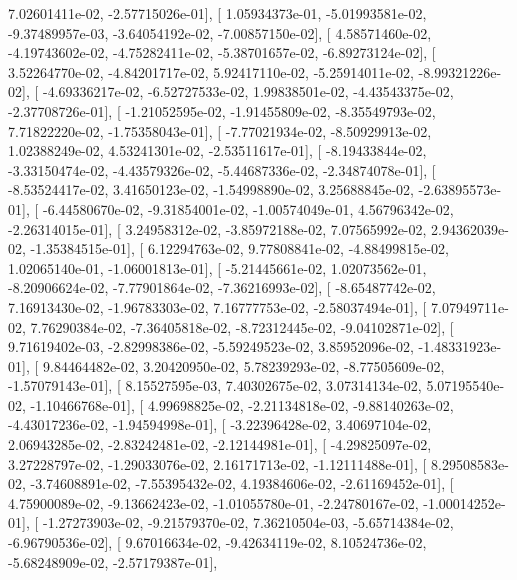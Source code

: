 \documentclass{article}
\begin{document}
          7.02601411e-02,  -2.57715026e-01],
       [  1.05934373e-01,  -5.01993581e-02,  -9.37489957e-03,
         -3.64054192e-02,  -7.00857150e-02],
       [  4.58571460e-02,  -4.19743602e-02,  -4.75282411e-02,
         -5.38701657e-02,  -6.89273124e-02],
       [  3.52264770e-02,  -4.84201717e-02,   5.92417110e-02,
         -5.25914011e-02,  -8.99321226e-02],
       [ -4.69336217e-02,  -6.52727533e-02,   1.99838501e-02,
         -4.43543375e-02,  -2.37708726e-01],
       [ -1.21052595e-02,  -1.91455809e-02,  -8.35549793e-02,
          7.71822220e-02,  -1.75358043e-01],
       [ -7.77021934e-02,  -8.50929913e-02,   1.02388249e-02,
          4.53241301e-02,  -2.53511617e-01],
       [ -8.19433844e-02,  -3.33150474e-02,  -4.43579326e-02,
         -5.44687336e-02,  -2.34874078e-01],
       [ -8.53524417e-02,   3.41650123e-02,  -1.54998890e-02,
          3.25688845e-02,  -2.63895573e-01],
       [ -6.44580670e-02,  -9.31854001e-02,  -1.00574049e-01,
          4.56796342e-02,  -2.26314015e-01],
       [  3.24958312e-02,  -3.85972188e-02,   7.07565992e-02,
          2.94362039e-02,  -1.35384515e-01],
       [  6.12294763e-02,   9.77808841e-02,  -4.88499815e-02,
          1.02065140e-01,  -1.06001813e-01],
       [ -5.21445661e-02,   1.02073562e-01,  -8.20906624e-02,
         -7.77901864e-02,  -7.36216993e-02],
       [ -8.65487742e-02,   7.16913430e-02,  -1.96783303e-02,
          7.16777753e-02,  -2.58037494e-01],
       [  7.07949711e-02,   7.76290384e-02,  -7.36405818e-02,
         -8.72312445e-02,  -9.04102871e-02],
       [  9.71619402e-03,  -2.82998386e-02,  -5.59249523e-02,
          3.85952096e-02,  -1.48331923e-01],
       [  9.84464482e-02,   3.20420950e-02,   5.78239293e-02,
         -8.77505609e-02,  -1.57079143e-01],
       [  8.15527595e-03,   7.40302675e-02,   3.07314134e-02,
          5.07195540e-02,  -1.10466768e-01],
       [  4.99698825e-02,  -2.21134818e-02,  -9.88140263e-02,
         -4.43017236e-02,  -1.94594998e-01],
       [ -3.22396428e-02,   3.40697104e-02,   2.06943285e-02,
         -2.83242481e-02,  -2.12144981e-01],
       [ -4.29825097e-02,   3.27228797e-02,  -1.29033076e-02,
          2.16171713e-02,  -1.12111488e-01],
       [  8.29508583e-02,  -3.74608891e-02,  -7.55395432e-02,
          4.19384606e-02,  -2.61169452e-01],
       [  4.75900089e-02,  -9.13662423e-02,  -1.01055780e-01,
         -2.24780167e-02,  -1.00014252e-01],
       [ -1.27273903e-02,  -9.21579370e-02,   7.36210504e-03,
         -5.65714384e-02,  -6.96790536e-02],
       [  9.67016634e-02,  -9.42634119e-02,   8.10524736e-02,
         -5.68248909e-02,  -2.57179387e-01],
\end{document}
